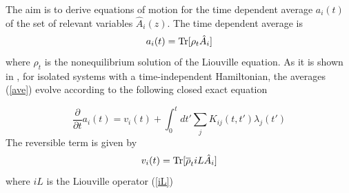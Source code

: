 \documentclass[a4paper,openright,12pt]{book}
\begin{document}
The  aim is  to
derive equations of motion for  the time dependent average $a_i(t)$ of
the set of relevant variables $\hat{A}_i(z)$. The time dependent average
is
\begin{equation}
  a_i(t)={\rm Tr}[\rho_t\hat{A}_i]
  \label{ave}
\end{equation}
where $\rho_t$ is
the nonequilibrium solution of the Liouville equation. As it is shown
in  \cite{Grabert1982},  for  isolated systems  with a time-independent
Hamiltonian,  the   averages  (\ref{ave})  evolve  according   to  the
following closed exact equation

\begin{equation}
\frac{\partial }{\partial t} a_i(t)
= v_i(t) + \int_0^t dt' \sum_j K_{ij}(t,t') \lambda_j(t')
\label{ex}
\end{equation}
The reversible term is given by
\begin{equation}
v_i(t) = {\rm Tr}[\overline{\rho}_t  iL \hat{A}_i]
\label{vit}
\end{equation}
where $iL$ is the Liouville operator (\ref{iL})
\end{document}
